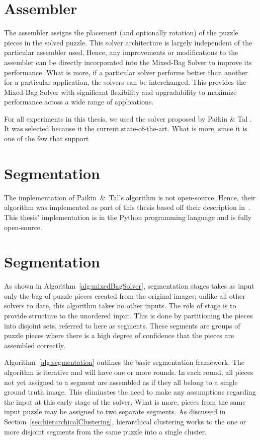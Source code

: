\section{Assembler}\label{sec:SolverAssembler}

The assembler assigns the placement (and optionally rotation) of the puzzle pieces in the solved puzzle.  This solver architecture is largely independent of the particular assembler used.  Hence, any improvements or modifications to the assembler can be directly incorporated into the Mixed-Bag Solver to improve its performance.  What is more, if a particular solver performs better than another for a particular application, the solvers can be interchanged.  This provides the Mixed-Bag Solver with significant flexibility and upgradability to maximize performance across a wide range of applications.

For all experiments in this thesis, we used the solver proposed by Paikin \& Tal \cite{paikin2015}.  It was selected because it the current state-of-the-art.  What is more, since it is one of the few that support


\section{Segmentation}\label{sec:Segmentation}

The implementation of Paikin~\&~Tal's algorithm is not open-source.  Hence, their algorithm was implemented as part of this thesis based off their description in~\cite{paikin2015}.  This thesis' implementation is in the Python programming language and is fully open-source.

\section{Segmentation}\label{sec:Segmentation}

As shown in Algorithm~\ref{alg:mixedBagSolver}, segmentation stages takes as input only the bag of puzzle pieces created from the original images; unlike all other solvers to date, this algorithm takes no other inputs.  The role of stage is to provide structure to the unordered input.  This is done by partitioning the pieces into disjoint sets, referred to here as segments.  These segments are groups of puzzle pieces where there is a high degree of confidence that the pieces are assembled correctly.

Algorithm~\ref{alg:segmentation} outlines the basic segmentation framework.  The algorithm is iterative and will have one or more rounds.  In each round, all pieces not yet assigned to a segment are assembled as if they all belong to a single ground truth image.  This eliminates the need to make any assumptions regarding the input at this early stage of the solver.  What is more, pieces from the same input puzzle may be assigned to two separate segments.  As discussed in Section~\ref{sec:hierarchicalClustering}, hierarchical clustering works to the one or more disjoint segments from the same puzzle into a single cluster.

